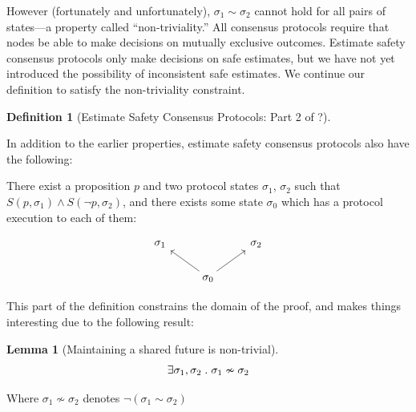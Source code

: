\documentclass{article}
\theoremstyle{definition}
\newtheorem{lemma}{Lemma}
\newtheorem{defn}{Definition}[section]
\begin{document}
However (fortunately and unfortunately), $\sigma_1 \sim \sigma_2$ cannot hold for all pairs of states---a property called ``non-triviality.'' All consensus protocols require that nodes be able to make decisions on mutually exclusive outcomes. Estimate safety consensus protocols only make decisions on safe estimates, but we have not yet introduced the possibility of inconsistent safe estimates. We continue our definition to satisfy the non-triviality constraint.

\begin{defn}[Estimate Safety Consensus Protocols: Part 2 of ?]
\begin{description}

In addition to the earlier properties, estimate safety consensus protocols also have the following:

\item[(Non-triviality)]

There exist a proposition $p$ and two protocol states $\sigma_1$, $\sigma_2$ such that $S(p,\sigma_1) \land S(\neg{p},\sigma_2)$, and there exists some state $\sigma_0$ which has a protocol execution to each of them:

\begin{equation*}
\begin{tikzcd}
\sigma_1  
  &
{}
  &
\sigma_2
  \\ 
  &
\sigma_0
  \arrow[ur,""]
  \arrow[ul,""]
\end{tikzcd}
\end{equation*}


\end{description}
\end{defn}

This part of the definition constrains the domain of the proof, and makes things interesting due to the following result:

\begin{lemma}[Maintaining a shared future is non-trivial]
$$
\exists \sigma_1, \sigma_2 \hspace{1mm}.\hspace{1mm} \sigma_1 \nsim \sigma_2
$$
\end{lemma}

Where $\sigma_1 \nsim \sigma_2$ denotes $\neg{(\sigma_1 \sim \sigma_2)}$
\end{document}
